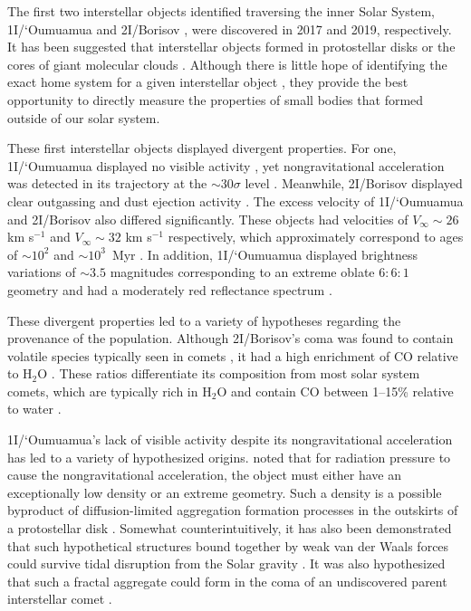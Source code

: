 \documentclass[linenumbers,twocolumn,longbib]{aastex7}
\begin{document}
The first two interstellar objects identified traversing the inner Solar System, 1I/`Oumuamua \citep{Williams17} and 2I/Borisov \citep{borisov_2I_cbet}, were discovered in 2017 and 2019, respectively. It has been suggested that interstellar objects formed in protostellar disks \citep{Fitzsimmons2024} or the cores of giant molecular clouds \citep{Hsieh2021}. Although there is little hope of identifying the exact home system for a given interstellar object \citep{Hallatt2020}, they provide the best opportunity to directly measure the properties of small bodies that formed outside of our solar system.

These first interstellar objects displayed divergent properties. For one, 1I/`Oumuamua displayed no visible activity \citep{Meech2017,Ye2017,Jewitt2017,Trilling2018}, yet nongravitational acceleration was detected in its trajectory at the $\sim30\sigma$ level \citep{Micheli2018}. Meanwhile, 2I/Borisov displayed clear outgassing and dust ejection activity \citep{Jewitt2019b,Fitzsimmons:2019,Bolin2019,Ye:2019,McKay2020,Guzik:2020,Hui2020,Kim2020,Cremonese2020,yang2021}. The excess velocity of 1I/`Oumuamua and 2I/Borisov also differed significantly. These objects had velocities of $V_\infty\sim26$ km s$^{-1}$ and $V_\infty\sim32$ km s$^{-1}$ respectively, which approximately correspond to ages of $\sim10^2$ and $\sim10^3$~Myr \citep{Mamajek2017,Gaidos2017a, Feng2018,Fernandes2018,Hallatt2020,Hsieh2021}. In addition, 1I/`Oumuamua displayed brightness variations of $\sim3.5$ magnitudes corresponding to an extreme oblate $6:6:1$ geometry \citep{Meech2017,Knight2017,Bolin2017,Fraser2017,Belton2018,Mashchenko2019,Taylor2023} and had a moderately red reflectance spectrum \citep{Meech2017,Fitzsimmons2017,Ye2017}.

These divergent properties led to a variety of hypotheses regarding the provenance of the population. Although 2I/Borisov's coma was found to contain volatile species typically seen in comets \citep{Opitom:2019-borisov, Kareta:2019, lin2020,Bannister2020,Xing2020,Bagnulo2021,Aravind2021}, it had a high enrichment of CO relative to H$_2$O \citep{Bodewits2020, Cordiner2020}. These ratios differentiate its composition from most solar system comets, which are typically rich in H$_2$O and contain CO between 1--15\% relative to water \citep{2024come.book..459B}.

1I/`Oumuamua's lack of visible activity despite its nongravitational acceleration has led to a variety of hypothesized origins. \citet{Micheli2018} noted that for radiation pressure to cause the nongravitational acceleration, the object must either have an exceptionally low density or an extreme geometry. Such a density is a possible byproduct of diffusion-limited aggregation formation processes in the outskirts of a protostellar disk \citep{MoroMartin2019}. Somewhat counterintuitively, it has also been demonstrated that such hypothetical structures bound together by weak van der Waals forces could survive tidal disruption from the Solar gravity \citep{Flekkoy19}. It was also hypothesized that such a fractal aggregate could form in the coma of an undiscovered parent interstellar comet \citep{Luu20}.
\end{document}
